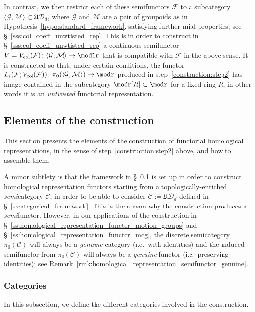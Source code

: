 \documentclass[AHL,Unicode,published]{cedram}
\newcommand{\col}{\mathrm{col}}
\newcommand{\fU}{\ensuremath{\mathfrak{U}}}
\newcommand{\cC}{\mathcal{C}}
\newcommand{\cD}{\mathcal{D}}
\newcommand{\cF}{\mathcal{F}}
\newcommand{\cG}{\mathcal{G}}
\newcommand{\cM}{\mathcal{M}}
\begin{document}
In contrast, we then restrict each of these semifunctors $\cF$ to a subcategory $\langle \cG, \cM \rangle \subset \fU\cD_{d}$, where $\cG$ and $\cM$ are a pair of groupoids as in Hypothesis~\ref{hypo:standard_framework}, satisfying further mild properties; see \S~\ref{sss:col_coeff_unwtisted_rep}. This is in order to construct in \S~\ref{sss:col_coeff_unwtisted_rep} a continuous semifunctor $V = V_{\col}(\cF) \colon \langle \cG, \cM \rangle \to \modlr$ that is compatible with $\cF$ in the above sense. It is constructed so that, under certain conditions, the functor $L_{i}(\cF;V_{\col}(\cF)) \colon \pi_{0}(\langle \cG, \cM \rangle) \to \modr$ produced in step~\eqref{construction:step2} has image contained in the subcategory $\modr[R] \subset \modr$ for a fixed ring $R$, in other words it is an \emph{untwisted} functorial representation.


\subsection{Elements of the construction}\label{ss:ingredients_construction_representations}

This section presents the elements of the construction of functorial homological representations, in the sense of step~\eqref{construction:step2} above, and how to assemble them.

A minor subtlety is that the framework in \S~\ref{ss:ingredients_construction_representations} is set up in order to construct homological representation functors starting from a topologically-enriched \emph{semi}category $\cC$, in order to be able to consider $\cC := \fU\cD_{d}$ defined in \S~\ref{s:categorical_framework}. This is the reason why the construction produces a \emph{semi}functor. However, in our applications of the construction in \S~\ref{ss:homological_representation_functor_motion_groups} and \S~\ref{ss:homological_representation_functor_mcg}, the discrete semicategory $\pi_{0}(\cC)$ will always be a \emph{genuine} category (i.e.~with identities) and the induced semifunctor from $\pi_{0}(\cC)$ will always be a \emph{genuine} functor (i.e.~preserving identities); see Remark~\ref{rmk:homological_representation_semifunctor_genuine}.


\subsubsection{Categories}\label{sss:categories}

In this subsection, we define the different categories involved in the construction.
\end{document}
